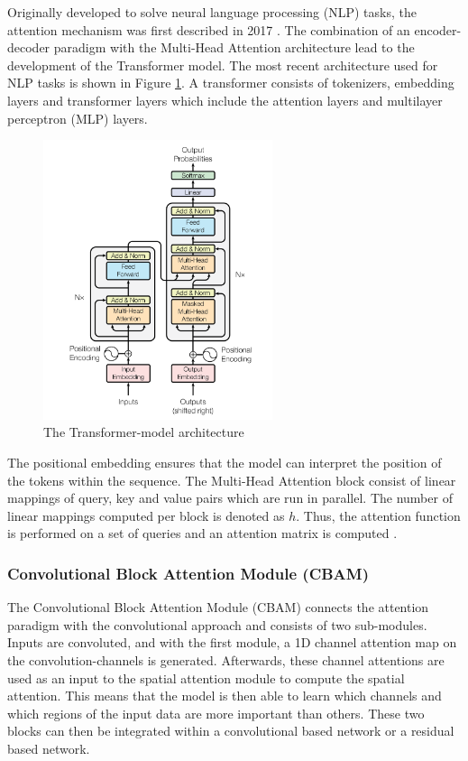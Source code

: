 Originally developed to solve neural language processing (NLP) tasks, the attention mechanism was first described in 2017 \cite{vaswani_attention_2023}.
The combination of an encoder-decoder paradigm with the Multi-Head Attention architecture lead to the development of the Transformer model. The most recent architecture used for NLP tasks is shown in Figure \ref{fig:transformer_model}.
A transformer consists of tokenizers, embedding layers and transformer layers which include the attention layers and multilayer perceptron (MLP) layers.

\begin{figure}[H]
    \centering
    \includegraphics[width=0.6\textwidth]{Figures/Transformer.png}
    \caption{The Transformer-model architecture \cite{vaswani_attention_2023}}
    \label{fig:transformer_model}
\end{figure}

The positional embedding ensures that the model can interpret the position of the tokens within the sequence. The Multi-Head Attention block consist of linear mappings of query, key and value pairs which are run in parallel. The number of linear mappings computed per block is denoted as $h$. Thus, the attention function is performed on a set of queries and an attention matrix is computed \cite{vaswani_attention_2023}.

\subsubsection{Convolutional Block Attention Module (CBAM)}
The Convolutional Block Attention Module (CBAM) connects the attention paradigm with the convolutional approach and consists of two sub-modules. Inputs are convoluted, and with the first module, a 1D channel attention map on the convolution-channels is generated. Afterwards, these channel attentions are used as an input to the spatial attention module to compute the spatial attention. This means that the model is then able to learn which channels and which regions of the input data are more important than others. These two blocks can then be integrated within a convolutional based network or a residual based network.

